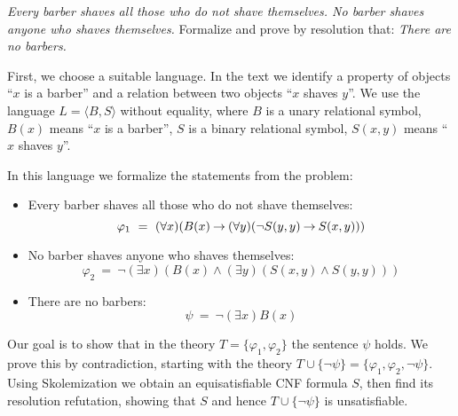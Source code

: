 \begin{problem} 
    
    \emph{Every barber shaves all those who do not shave themselves. No barber shaves anyone who shaves themselves.} Formalize and prove by resolution that: \emph{There are no barbers.}

    \begin{solution}

        First, we choose a suitable language. In the text we identify a property of objects ``$x$ is a barber'' and a relation between two objects ``$x$ shaves $y$''. We use the language $L=\langle B, S\rangle$ without equality, where $B$ is a unary relational symbol, $B(x)$ means ``$x$ is a barber'', $S$ is a binary relational symbol, $S(x,y)$ means ``$x$ shaves $y$''. 
        
        In this language we formalize the statements from the problem:
        \begin{itemize}
            \item Every barber shaves all those who do not shave themselves: 
            $$
            \varphi_1\ =\ (\forall x)(B(x)\mathbin{\rightarrow} (\forall y)(\neg S(y,y)\mathbin{\rightarrow} S(x,y)))
            $$
            \item No barber shaves anyone who shaves themselves: 
            $$
            \varphi_2\ =\ \neg (\exists x)(B(x) \land (\exists y)(S(x,y)\land S(y,y)))
            $$
            \item There are no barbers:
            $$
            \psi\ =\ \neg (\exists x)B(x)
            $$
        \end{itemize}
        Our goal is to show that in the theory $T=\{\varphi_1,\varphi_2\}$ the sentence $\psi$ holds. We prove this by contradiction, starting with the theory $T\cup\{\neg\psi\}=\{\varphi_1,\varphi_2,\neg\psi\}$. Using Skolemization we obtain an equisatisfiable CNF formula $S$, then find its resolution refutation, showing that $S$ and hence $T\cup\{\neg\psi\}$ is unsatisfiable.


\end{solution}
\end{problem}
